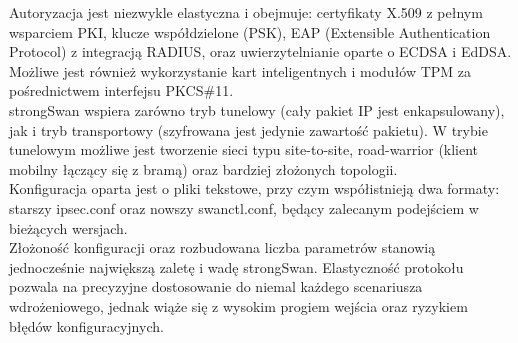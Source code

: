 Autoryzacja jest niezwykle elastyczna i obejmuje: certyfikaty X.509 z pełnym wsparciem PKI, klucze współdzielone (PSK), EAP (Extensible Authentication Protocol) z integracją RADIUS, oraz uwierzytelnianie oparte o ECDSA i EdDSA.\\

Możliwe jest również wykorzystanie kart inteligentnych i modułów TPM za pośrednictwem interfejsu PKCS\#11.\\

strongSwan wspiera zarówno tryb tunelowy (cały pakiet IP jest enkapsulowany), jak i tryb transportowy (szyfrowana jest jedynie zawartość pakietu). W trybie tunelowym możliwe jest tworzenie sieci typu site-to-site, road-warrior (klient mobilny łączący się z bramą) oraz bardziej złożonych topologii.\\

Konfiguracja oparta jest o pliki tekstowe, przy czym współistnieją dwa formaty: starszy ipsec.conf oraz nowszy swanctl.conf, będący zalecanym podejściem w bieżących wersjach.\\

Złożoność konfiguracji oraz rozbudowana liczba parametrów stanowią jednocześnie największą zaletę i wadę strongSwan. Elastyczność protokołu pozwala na precyzyjne dostosowanie do niemal każdego scenariusza wdrożeniowego, jednak wiąże się z wysokim progiem wejścia oraz ryzykiem błędów konfiguracyjnych.